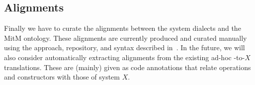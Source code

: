 \subsection{Alignments}

Finally we have to curate the alignments between the system dialects and the MitM ontology.
These alignments are currently produced and curated manually using the approach, repository, and syntax described in~\cite{MueGauKal:cacfms17,MueRoYuRa:abtafs17}.
In the future, we will also consider automatically extracting alignments from the existing ad-hoc \Sage-to-$X$ translations.
These are (mainly) given as \Sage code annotations that relate \Sage operations and constructors with those of system $X$.


%





